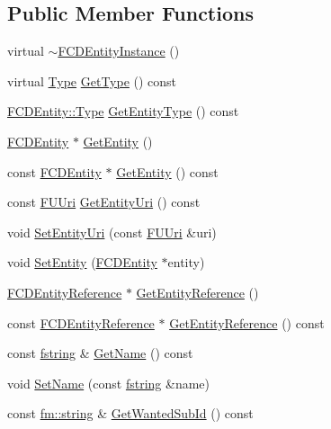 \subsection*{Public Member Functions}
\begin{DoxyCompactItemize}
\item 
virtual \hyperlink{classFCDEntityInstance_ac7e14bc4e56fabd5781421423ce45228}{$\sim$FCDEntityInstance} ()
\item 
virtual \hyperlink{classFCDEntityInstance_a82e95eec7d9242bbedb336b0d35b59d3}{Type} \hyperlink{classFCDEntityInstance_a773c2cfdbad937e93da7a3fa71a671a7}{GetType} () const 
\item 
\hyperlink{classFCDEntity_a9301a4bd5f4d4190ec13e40db4effdd7}{FCDEntity::Type} \hyperlink{classFCDEntityInstance_a62d378c0770ebc2ece12f4083701616c}{GetEntityType} () const 
\item 
\hyperlink{classFCDEntity}{FCDEntity} $\ast$ \hyperlink{classFCDEntityInstance_a88b34b3df90a7067487e5ccf0ca81dd4}{GetEntity} ()
\item 
const \hyperlink{classFCDEntity}{FCDEntity} $\ast$ \hyperlink{classFCDEntityInstance_ac311fa6264528437a06bf02fb9a2b3a8}{GetEntity} () const 
\item 
const \hyperlink{classFUUri}{FUUri} \hyperlink{classFCDEntityInstance_a4cb45e1e4a30bf419f07b7562115a57b}{GetEntityUri} () const 
\item 
void \hyperlink{classFCDEntityInstance_a248b8d0d704f7132c90fe394ba3d7183}{SetEntityUri} (const \hyperlink{classFUUri}{FUUri} \&uri)
\item 
void \hyperlink{classFCDEntityInstance_ab67be7fa194a7ece56000d1895fb03d9}{SetEntity} (\hyperlink{classFCDEntity}{FCDEntity} $\ast$entity)
\item 
\hyperlink{classFCDEntityReference}{FCDEntityReference} $\ast$ \hyperlink{classFCDEntityInstance_a61a2ecec539dcbd32ae2637eca38b200}{GetEntityReference} ()
\item 
const \hyperlink{classFCDEntityReference}{FCDEntityReference} $\ast$ \hyperlink{classFCDEntityInstance_a16bc7b1145a2ba8c7fb71646f082c693}{GetEntityReference} () const 
\item 
const \hyperlink{classfm_1_1stringT}{fstring} \& \hyperlink{classFCDEntityInstance_a2c4633c7a62e6a3e998bcbb1e824a0d7}{GetName} () const 
\item 
void \hyperlink{classFCDEntityInstance_a64d90994ebec198429a38f7e7d349f5c}{SetName} (const \hyperlink{classfm_1_1stringT}{fstring} \&name)
\item 
const \hyperlink{classfm_1_1stringT}{fm::string} \& \hyperlink{classFCDEntityInstance_ac5cb2ab3ab829af54320f570df7d8f35}{GetWantedSubId} () const 

\end{DoxyCompactItemize}
